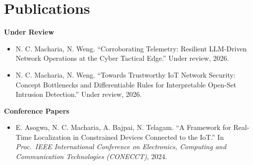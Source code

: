 \documentclass[10.5pt,letterpaper]{article}
\begin{document}
\section*{Publications}
\textbf{Under Review}
\begin{itemize}
  \item N. C. Macharia, N. Weng. ``Corroborating Telemetry: Resilient LLM-Driven Network
        Operations at the Cyber Tactical Edge.'' Under review, 2026.
  \item N. C. Macharia, N. Weng. ``Towards Trustworthy IoT Network Security: Concept Bottlenecks
        and Differentiable Rules for Interpretable Open-Set Intrusion Detection.'' Under review, 2026.
\end{itemize}
\vspace{0.3em}
\textbf{Conference Papers}
\begin{itemize}
  \item E. Asogwa, N. C. Macharia, A. Bajpai, N. Telagam. ``A Framework for Real-Time Localization
        in Constrained Devices Connected to the IoT.'' In \textit{Proc.\ IEEE International Conference
        on Electronics, Computing and Communication Technologies (CONECCT)}, 2024.
\end{itemize}

\end{document}
